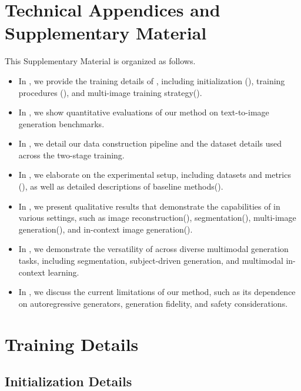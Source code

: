 \clearpage
\appendix
\section{Technical Appendices and Supplementary Material}
\noindent This Supplementary Material is organized as follows.  

\begin{itemize}[left=0pt]
    \item In , we provide the training details of \model, including initialization (), training procedures (), and multi-image training strategy().
    \item In , we show quantitative evaluations of our method on text-to-image generation benchmarks.
    \item In , we detail our data construction pipeline and the dataset details used across the two-stage training.
    \item In , we elaborate on the experimental setup, including datasets and metrics (), as well as detailed descriptions of baseline methods().
    \item In , we present qualitative results that demonstrate the capabilities of \model in various settings, such as image reconstruction(), segmentation(), multi-image generation(), and in-context image generation().
    \item In , we demonstrate the versatility of \model across diverse multimodal generation tasks, including segmentation, subject-driven generation, and multimodal in-context learning.
    \item In , we discuss the current limitations of our method, such as its dependence on autoregressive generators, generation fidelity, and safety considerations.
\end{itemize}


\section{Training Details}
\label{sec:Exp_Details}

\subsection{Initialization Details}
\label{sec:init_Details}

